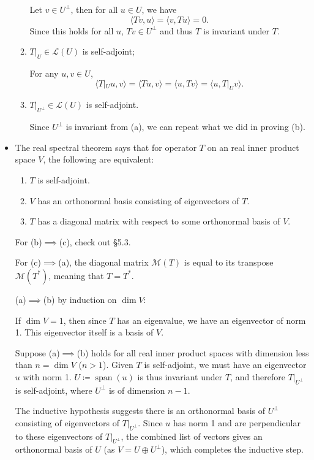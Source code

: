 \documentclass{article}
\newcommand{\s}{\operatorname{span}}
\renewcommand{\d}{\dim}
\newcommand{\inp}[2]{\langle #1, #2 \rangle}
\newcommand{\M}{\mathcal{M}}
\begin{document}
\begin{itemize}
\begin{enumerate}[label=(\alph*)]
        Let $v \in U^\perp$, then for all $u \in U$, we have $$\inp{Tv}{u}=\inp{v}{Tu}=0.$$ Since this holds for all $u$, $Tv \in U^\perp$ and thus $T$ is invariant under $T$.
        \item $T|_U \in \mathcal{L}(U)$ is self-adjoint;
        
        For any $u,v \in U$,
        $$\inp{T|_U u}{v}=\inp{Tu}{v}=\inp{u}{Tv}=\inp{u}{T|_U v}.$$
        \item $T|_{U^\perp} \in \mathcal{L}(U)$ is self-adjoint.
        
        Since $U^\perp$ is invariant from (a), we can repeat what we did in proving (b).
    \end{enumerate}
    
    \item The real spectral theorem says that for operator $T$ on an real inner product space $V$, the following are equivalent:
    \begin{enumerate}[label=(\alph*)]
        \item $T$ is self-adjoint.
        \item $V$ has an orthonormal basis consisting of eigenvectors of $T$.
        \item $T$ has a diagonal matrix with respect to some orthonormal basis of $V$.
    \end{enumerate}
    
    For (b)$\implies$(c), check out \S 5.3.
    
    For (c)$\implies$(a), the diagonal matrix $\M(T)$ is equal to its transpose $\M(T^*)$, meaning that $T = T^*$.
    
    (a)$\implies$(b) by induction on $\d V$:
    
    If $\d V = 1$, then since $T$ has an eigenvalue, we have an eigenvector of norm 1. This eigenvector itself is a basis of $V$.
    
    Suppose (a)$\implies$(b) holds for all real inner product spaces with dimension less than $n = \d V$ ($n > 1$). Given $T$ is self-adjoint, we must have an eigenvector $u$ with norm 1. $U \coloneqq \s(u)$ is thus invariant under $T$, and therefore $T|_{U^\perp}$ is self-adjoint, where $U^\perp$ is of dimension $n-1$.
    
    The inductive hypothesis suggests there is an orthonormal basis of $U^\perp$ consisting of eigenvectors of $T|_{U^\perp}$. Since $u$ has norm 1 and are perpendicular to these eigenvectors of $T|_{U^\perp}$, the combined list of vectors gives an orthonormal basis of $U$ (as $V=U\oplus U^\perp$), which completes the inductive step.
    
\end{itemize}
\end{document}
